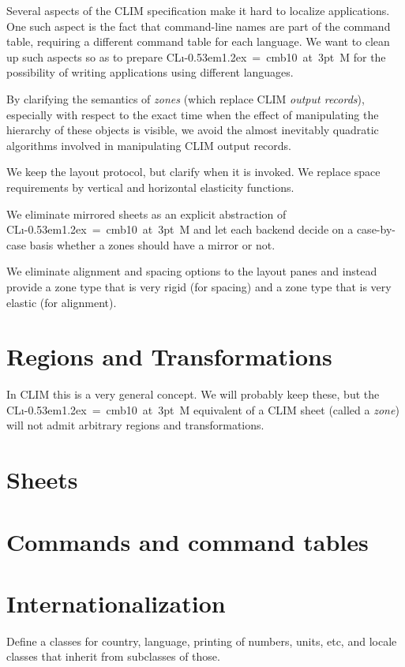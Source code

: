 \documentclass{report}
\def\Tiny{ \font\Tinyfont = cmb10 at 3pt \relax  \Tinyfont}
\def\clim{\textsf{CL{\i}\kern-0.53em\raise1.2ex\hbox{\Tiny 3}M}}
\def\climtwo{CLIM\thinspace{\small II}}
\begin{document}
Several aspects of the \climtwo{} specification make it hard to
localize applications.  One such aspect is the fact that command-line
names are part of the command table, requiring a different command
table for each language.  We want to clean up such aspects so as to
prepare \clim{} for the possibility of writing applications using
different languages. 

By clarifying the semantics of \emph{zones} (which replace \climtwo{}
\emph{output records}), especially with respect to the exact time when
the effect of manipulating the hierarchy of these objects is visible,
we avoid the almost inevitably quadratic algorithms involved in
manipulating \climtwo{} output records. 

We keep the layout protocol, but clarify when it is invoked.  We
replace space requirements by vertical and horizontal elasticity
functions. 

We eliminate mirrored sheets as an explicit abstraction of \clim{} and
let each backend decide on a case-by-case basis whether a zones should
have a mirror or not.

We eliminate alignment and spacing options to the layout panes and
instead provide a zone type that is very rigid (for spacing) and a
zone type that is very elastic (for alignment).

\section{Regions and Transformations}

In \climtwo{} this is a very general concept.  We will probably keep
these, but the \clim{} equivalent of a \climtwo{} sheet (called a
\emph{zone}) will not admit arbitrary regions and transformations. 

\section{Sheets}

\section{Commands and command tables}

\section{Internationalization}

Define a classes for country, language, printing of numbers, units,
etc, and locale classes that inherit from subclasses of those.
\end{document}
